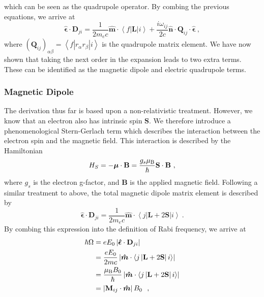 \documentclass{article}
\begin{document}
which can be seen as the quadrupole operator. By combing the previous equations, we arrive at 
\begin{equation}
    \boldsymbol{\hat{\epsilon}}\cdot\mathbf{D}_{ji} = \frac{1}{2m_e c} \boldsymbol{\hat{m}}\cdot \left\langle f \left|\mathbf{L} \right| i \right\rangle + \frac{i\omega_{ij}}{2c}\boldsymbol{\hat{n}}\cdot\mathbf{Q}_{ij}\cdot \boldsymbol{\hat{\epsilon}}~,    
\end{equation}
where $\left(\mathbf{Q}_{ij}\right)_{\alpha\beta} =  \left\langle f \left|r_{\alpha} r_{\beta} \right| i \right\rangle$ is the quadrupole matrix element. We have now shown that taking the next order in the expansion leads to two extra terms. These can be identified as the magnetic dipole and electric quadrupole terms.

\subsubsection{Magnetic Dipole}
The derivation thus far is based upon a non-relativistic treatment. However, we know that an electron also has intrinsic spin $\mathbf{S}$. We therefore introduce a phenomenological Stern-Gerlach term which describes the interaction between the electron spin and the magnetic field. This interaction is described by the Hamiltonian
\begin{equation}
     H_S = -\boldsymbol{\mu}\cdot\mathbf{B} = \frac{g_s \mu_{\rm{B}}}{\hbar}\mathbf{S}\cdot\mathbf{B}~,
\end{equation}
where $g_s$ is the electron g-factor, and $\mathbf{B}$ is the applied magnetic field. Following a similar treatment to above, the total magnetic dipole matrix element is described by  
\begin{equation}
    \boldsymbol{\hat{\epsilon}}\cdot\mathbf{D}_{ji} = \frac{1}{2m_ec}\boldsymbol{\hat{m}}\cdot \left\langle j \left|\mathbf{L} + 2\mathbf{S} \right| i \right\rangle~.
\end{equation}
By combing this expression into the definition of Rabi frequency, we arrive at 
\begin{align}
    \hbar \Omega &= e E_0 \left|\boldsymbol{\hat{\epsilon}}\cdot\mathbf{D}_{ji}\right| \\
    &= \frac{eE_0}{2mc}\left|\boldsymbol{\hat{m}}\cdot \left\langle j \left|\mathbf{L} + 2\mathbf{S} \right| i \right\rangle\right| \\
    &=\frac{\mu_{\rm{B}}B_0}{\hbar}\left|\boldsymbol{\hat{m}}\cdot \left\langle j \left|\mathbf{L} + 2\mathbf{S} \right| i \right\rangle\right| \\
    &= \left|\mathbf{M}_{ij} \cdot \boldsymbol{\hat{m}} \right|B_0~~,
\end{align}
\end{document}
